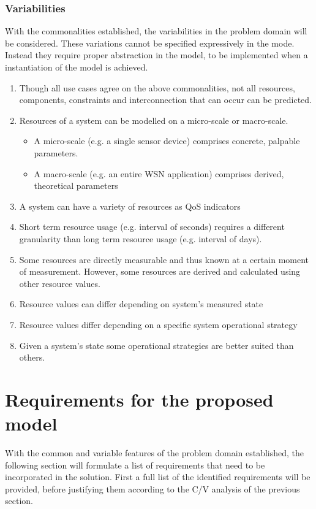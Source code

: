 \subsubsection{Variabilities}
With the commonalities established, the variabilities in the problem domain will be considered. These variations cannot be specified expressively in the mode. Instead they require proper abstraction in the model, to be implemented when a instantiation of the model is achieved.
\begin{enumerate}[label=V\rdmid .\arabic*]
\nospace
\item \label{v:1obvious} Though all use cases agree on the above commonalities, not all resources, components, constraints and interconnection that can occur can be predicted.
\item \label{v:2micro_macro} Resources of a system can be modelled on a micro-scale or macro-scale.
\begin{itemize}
\nospace
\item A micro-scale (e.g. a single sensor device) comprises concrete, palpable parameters.
\item A macro-scale (e.g. an entire WSN application) comprises derived, theoretical parameters
\end{itemize}
\item \label{v:3nr_optimizer} A system can have a variety of resources as QoS indicators
\item \label{v:4granularity} Short term resource usage (e.g. interval of seconds) requires a different granularity than long term resource usage (e.g. interval of days).
\item \label{v:5measure_vs_derive} Some resources are directly measurable and thus known at a certain moment of measurement. However, some resources are derived and calculated using other resource values.
\item \label{v:6state} Resource values can differ depending on system's measured state
\item \label{v:7function} Resource values differ depending on a specific system operational strategy
\item \label{v:8rum} Given a system's state some operational strategies are better suited than others.
\end{enumerate}

\section{Requirements for the proposed model}
With the common and variable features of the problem domain established, the following section will formulate a list of requirements that need to be incorporated in the solution. First a full list of the identified requirements will be provided, before justifying them according to the C/V analysis of the previous section.
